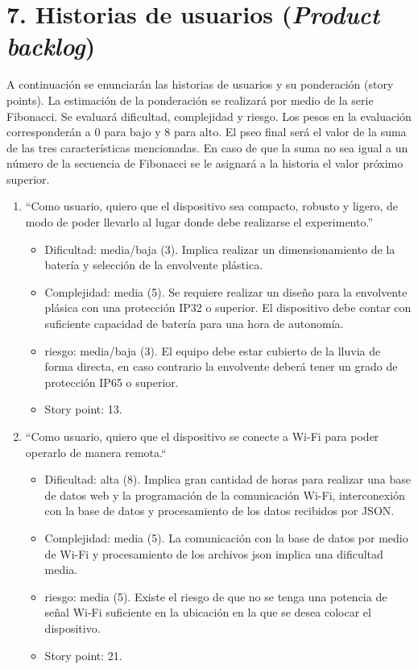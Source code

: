 \documentclass[
11pt, %
codirector, %
]{charter}
\begin{document}
\section{7. Historias de usuarios (\textit{Product backlog})}
\label{sec:backlog}

A continuación se enunciarán las historias de usuarios y su ponderación (story points). La estimación de la ponderación se realizará por medio de la serie Fibonacci. Se evaluará dificultad, complejidad y riesgo. Los pesos en la evaluación corresponderán a 0 para bajo y 8 para alto. El pseo final será el valor de la suma de las tres características mencionadas. En caso de que la suma no sea igual a un número de la secuencia de Fibonacci se le asignará a la historia el valor próximo superior.

\begin{enumerate}
	\item “Como usuario, quiero que el dispositivo sea compacto, robusto y ligero, de modo de poder llevarlo al lugar donde debe realizarse el experimento.”
		\begin{itemize}
		\item Dificultad: media/baja (3). Implica realizar un dimensionamiento de la batería y selección de la envolvente plástica.
		\item Complejidad: media (5). Se requiere realizar un diseño para la envolvente plásica con una protección IP32 o superior. El dispositivo debe contar con suficiente capacidad de batería para una hora de autonomía.
		\item riesgo: media/baja (3). El equipo debe estar cubierto de la lluvia de forma directa, en caso contrario la envolvente deberá tener un grado de protección IP65 o superior.
		\item Story point: 13.
		\end{itemize}
\vspace{5mm}
	\item “Como usuario, quiero que el dispositivo se conecte a Wi-Fi para poder operarlo de manera remota.“
		\begin{itemize}
		\item Dificultad: alta (8). Implica gran cantidad de horas para realizar una base de datos web y la programación de la comunicación Wi-Fi, interconexión con la base de datos y procesamiento de los datos recibidos por JSON.
		\item Complejidad: media (5). La comunicación con la base de datos por medio de Wi-Fi y procesamiento de los archivos json implica una dificultad media.
		\item riesgo: media (5). Existe el riesgo de que no se tenga una potencia de señal Wi-Fi suficiente en la ubicación en la que se desea colocar el dispositivo.
		\item Story point: 21.
		\end{itemize}
		

\end{enumerate}
\end{document}
